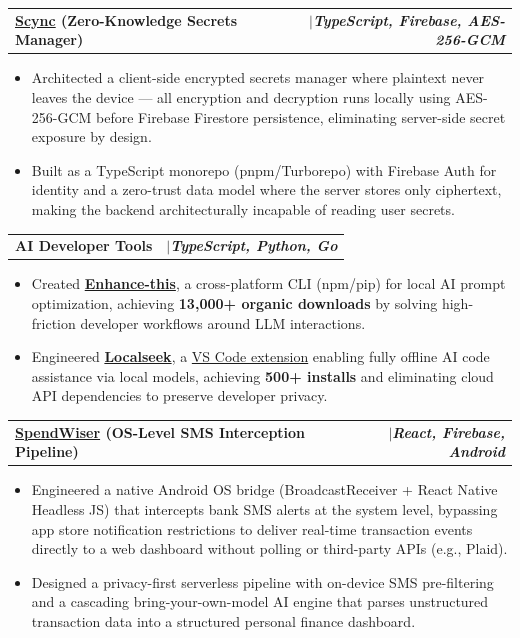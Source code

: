 \documentclass[a4paper,10pt]{article}
\makeatletter
\newcommand{\resumeItem}[1]{
  \item\small{
    {#1 \vspace{-1.2pt}}
  }
}
\newcommand{\resumeProjectHeading}[2]{
    \item
    \begin{tabular*}{0.97\textwidth}{l@{\extracolsep{\fill}}r}
      \small#1 & #2 \\
    \end{tabular*}\vspace{-3pt}
}
\newcommand{\resumeItemListStart}{\begin{itemize}}
\newcommand{\resumeItemListEnd}{\end{itemize}\vspace{-3pt}}
\makeatother
\begin{document}
    \vspace{-2pt}
    \resumeProjectHeading
      {\textbf{\href{https://github.com/hariharen9/scync}{Scync} (Zero-Knowledge Secrets Manager)}}
      {$|$\hspace{0.5em}\emph{\textbf{TypeScript, Firebase, AES-256-GCM}}}
      \resumeItemListStart
        \resumeItem{Architected a client-side encrypted secrets manager where plaintext never leaves the device --- all encryption and decryption runs locally using AES-256-GCM before Firebase Firestore persistence, eliminating server-side secret exposure by design.}
        \resumeItem{Built as a TypeScript monorepo (pnpm/Turborepo) with Firebase Auth for identity and a zero-trust data model where the server stores only ciphertext, making the backend architecturally incapable of reading user secrets.}
      \resumeItemListEnd

    \vspace{-2pt}
    \resumeProjectHeading
      {\textbf{AI Developer Tools}}
      {$|$\hspace{0.5em}\emph{\textbf{TypeScript, Python, Go}}}
      \resumeItemListStart
        \resumeItem{Created \textbf{\href{https://github.com/hariharen9/enhance-this}{Enhance-this}}, a cross-platform CLI (npm/pip) for local AI prompt optimization, achieving \textbf{13,000+ organic downloads} by solving high-friction developer workflows around LLM interactions.}
        \resumeItem{Engineered \textbf{\href{https://github.com/hariharen9/localseek}{Localseek}}, a \href{https://marketplace.visualstudio.com/items?itemName=Hariharen.localseek}{VS Code extension} enabling fully offline AI code assistance via local models, achieving \textbf{500+ installs} and eliminating cloud API dependencies to preserve developer privacy.}
      \resumeItemListEnd

    \vspace{-2pt}
    \resumeProjectHeading
      {\textbf{\href{https://github.com/hariharen9/spendwiser}{SpendWiser} (OS-Level SMS Interception Pipeline)}}
      {$|$\hspace{0.5em}\emph{\textbf{React, Firebase, Android}}}
      \resumeItemListStart
        \resumeItem{Engineered a native Android OS bridge (BroadcastReceiver + React Native Headless JS) that intercepts bank SMS alerts at the system level, bypassing app store notification restrictions to deliver real-time transaction events directly to a web dashboard without polling or third-party APIs (e.g., Plaid).}
        \resumeItem{Designed a privacy-first serverless pipeline with on-device SMS pre-filtering and a cascading bring-your-own-model AI engine that parses unstructured transaction data into a structured personal finance dashboard.}
      \resumeItemListEnd
\end{document}
